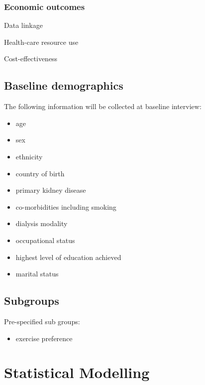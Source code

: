 \documentclass[
]{article}
\providecommand{\tightlist}{%
  \setlength{\itemsep}{0pt}\setlength{\parskip}{0pt}}
\begin{document}
\hypertarget{economic-outcomes}{
  \subsubsection{Economic outcomes}\label{economic-outcomes}}

Data linkage

Health-care resource use
  
Cost-effectiveness


\hypertarget{baseline}{
  \subsection{Baseline demographics}\label{baseline}}

The following information will be collected at baseline interview:

\begin{itemize}
  \tightlist
  \item age
  \item sex
  \item ethnicity
  \item country of birth
  \item primary kidney disease
  \item co-morbidities including smoking
  \item dialysis modality
  \item occupational status
  \item highest level of education achieved
  \item marital status
\end{itemize}

\hypertarget{subgroups}{%
  \subsection{Subgroups}\label{subgroups}}

Pre-specified sub groups:

\begin{itemize}
  \item exercise preference
\end{itemize}

\clearpage

\hypertarget{statistical-modelling}{%
  \section{Statistical Modelling}\label{statistical-modelling}}
\end{document}

